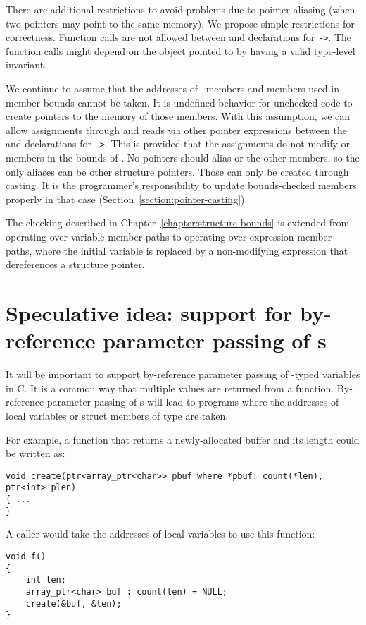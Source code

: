 There are additional restrictions to avoid problems due to pointer aliasing 
(when two pointers may point to the same memory).   We propose simple restrictions
for correctness.
Function calls are not allowed between  and 
 declarations for \texttt{->}.  The function calls 
might depend on the object pointed to by  having a  valid type-level invariant.
  
We continue to assume that the addresses of \arrayptr\ members and members
used in member bounds cannot be taken.  It is undefined behavior for unchecked
code to create pointers to the memory of those members.   With this assumption, we 
can allow assignments through and reads via other pointer expressions
between the  and  declarations for
\texttt{->}.  This is provided that the assignments do not modify 
 or members in the bounds of .  No pointers should alias
 or the other members, so the only aliases can be other structure
pointers.  Those can only be created through casting.  It is the programmer's responsibility
to update bounds-checked members properly in that case (Section~\ref{section:pointer-casting}).

The checking described in Chapter~\ref{chapter:structure-bounds} is extended from
operating over variable member paths to operating over expression member paths, where
the initial variable is replaced by a non-modifying expression that dereferences a structure
pointer.

\section{Speculative idea: support for by-reference parameter passing of \protect\arrayptr s}

It will be important to support by-reference parameter passing of \arrayptr-typed variables
in C.  It is a common way that multiple values are returned from a function.  By-reference parameter
passing of \arrayptr s will lead to programs where the addresses of local variables or struct
members of type \arrayptr are taken.

For example, a function that returns a newly-allocated buffer and its length could be written as:
\begin{verbatim}
void create(ptr<array_ptr<char>> pbuf where *pbuf: count(*len), ptr<int> plen)
{ ...
}
\end{verbatim}
A caller would take the addresses of local variables to use this function:
\begin{verbatim}
void f()
{
    int len;
    array_ptr<char> buf : count(len) = NULL;
    create(&buf, &len);
}
\end{verbatim}


